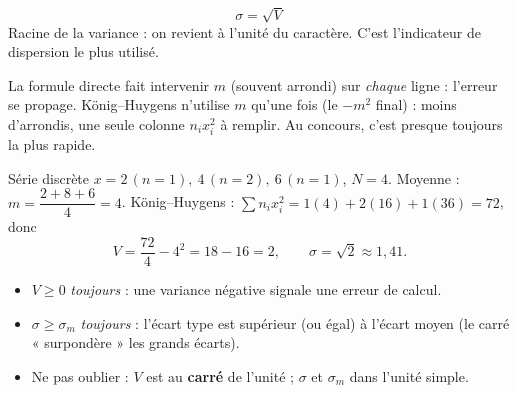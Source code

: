 \documentclass[11pt,a4paper]{article}
\newcommand{\ecm}{\sigma_m}
\newcommand{\ect}{\sigma}
\begin{document}
\begin{formule}[écart type $\ect$]
\[ \boxed{\;\ect=\sqrt{V}\;} \]
Racine de la variance : on revient à l'unité du caractère. C'est l'indicateur de dispersion
le plus utilisé.
\end{formule}

\begin{remarque}
La formule directe fait intervenir $m$ (souvent arrondi) sur \emph{chaque} ligne : l'erreur se
propage. König--Huygens n'utilise $m$ qu'une fois (le $-m^2$ final) : moins d'arrondis, une seule
colonne $n_i x_i^2$ à remplir. Au concours, c'est presque toujours la plus rapide.
\end{remarque}

\begin{exemple}
Série discrète $x=2\,(n{=}1),\ 4\,(n{=}2),\ 6\,(n{=}1)$, $N=4$.
Moyenne : $m=\dfrac{2+8+6}{4}=4$.
König--Huygens : $\sum n_i x_i^2=1(4)+2(16)+1(36)=72$, donc
\[ V=\frac{72}{4}-4^2=18-16=2,\qquad \ect=\sqrt2\approx1{,}41. \]
\end{exemple}

\begin{attention}
\begin{itemize}
  \item $V\geqslant0$ \emph{toujours} : une variance négative signale une erreur de calcul.
  \item $\ect\geqslant\ecm$ \emph{toujours} : l'écart type est supérieur (ou égal) à l'écart moyen
        (le carré « surpondère » les grands écarts).
  \item Ne pas oublier : $V$ est au \textbf{carré} de l'unité ; $\ect$ et $\ecm$ dans l'unité simple.
\end{itemize}
\end{attention}
\end{document}
